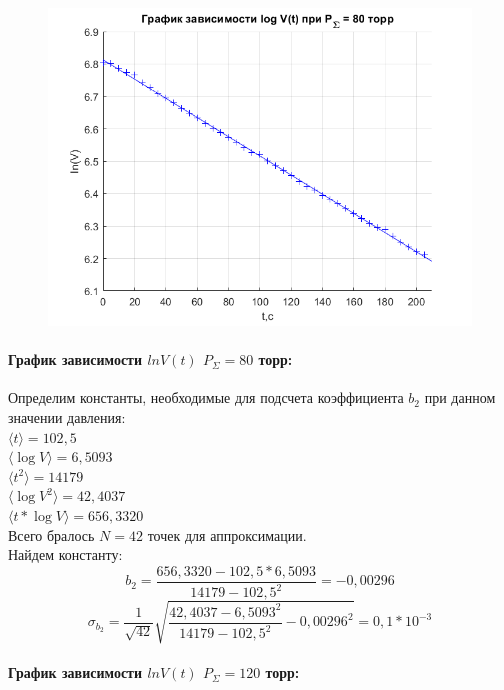 \documentclass[a4paper,12pt]{article}
\begin{document}
\begin{enumerate}
\begin{figure}[h]
\begin{center}
\begin{minipage}[h]{0.45\linewidth}
\includegraphics[width=1\linewidth]{gr_80_t.png}
\end{minipage}
\end{center}
\end{figure}
\paragraph{График зависимости $lnV(t)$ $P_{\Sigma} = 80$ торр:}

Определим константы, необходимые для подсчета коэффициента $b_2$ при данном значении давления:\\
$\langle t \rangle = 102,5$\\ 
$\langle \log V \rangle = 6,5093$\\
$\langle t^2 \rangle = 14179$\\
$\langle \log V^2 \rangle = 42,4037$\\
$\langle t*\log V \rangle = 656,3320$\\
Всего бралось $ N = 42$ точек для аппроксимации. \\
Найдем константу:
\begin{equation*}
b_2 = \dfrac{656,3320 - 102,5*6,5093}{14179 - 102,5^2} = -0,00296
\end{equation*}
\begin{equation*}
\sigma_{b_2} = \frac{1}{\sqrt{42}}\sqrt{\frac{42,4037 - 6,5093^2}{14179 - 102,5^2} - 0,00296^2} = 0,1 * 10^{-3}
\end{equation*}
\end{enumerate}

\paragraph{График зависимости $lnV(t)$ $P_{\Sigma} = 120$ торр:}
\end{document}
